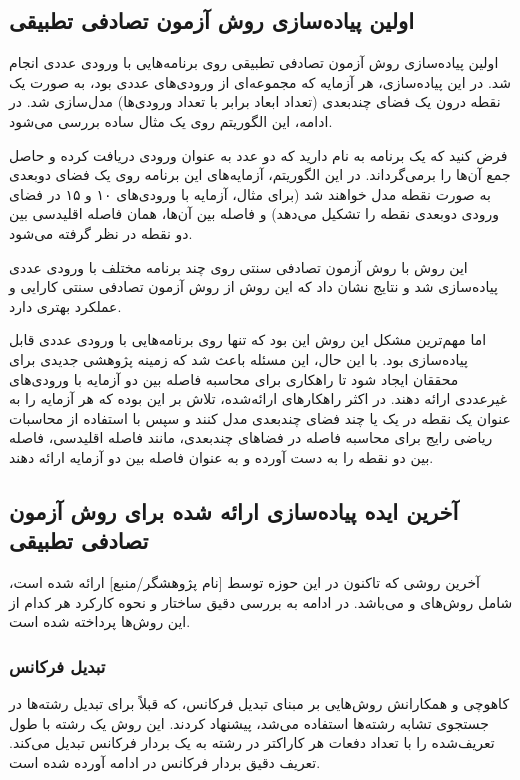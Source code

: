\subsection{اولین پیاده‌سازی روش آزمون تصادفی تطبیقی}
اولین پیاده‌سازی روش آزمون تصادفی تطبیقی روی برنامه‌هایی با ورودی عددی انجام شد. در این پیاده‌سازی، هر آزمایه که مجموعه‌ای از ورودی‌های عددی بود، به صورت یک نقطه درون یک فضای چندبعدی (تعداد ابعاد برابر با تعداد ورودی‌ها) مدل‌سازی شد. در ادامه، این الگوریتم روی یک مثال ساده بررسی می‌شود.

فرض کنید که یک برنامه به نام  دارید که دو عدد به عنوان ورودی دریافت کرده و حاصل جمع آن‌ها را برمی‌گرداند. در این الگوریتم، آزمایه‌های این برنامه روی یک فضای دوبعدی به صورت نقطه مدل خواهند شد (برای مثال، آزمایه با ورودی‌های ۱۰ و ۱۵ در فضای ورودی دوبعدی نقطه  را تشکیل می‌دهد) و فاصله بین آن‌ها، همان فاصله اقلیدسی بین دو نقطه در نظر گرفته می‌شود.

این روش با روش آزمون تصادفی سنتی روی چند برنامه مختلف با ورودی عددی پیاده‌سازی شد و نتایج نشان داد که این روش از روش آزمون تصادفی سنتی کارایی و عملکرد بهتری دارد.

اما مهم‌ترین مشکل این روش این بود که تنها روی برنامه‌هایی با ورودی عددی قابل پیاده‌سازی بود. با این حال، این مسئله باعث شد که زمینه پژوهشی جدیدی برای محققان ایجاد شود تا راهکاری برای محاسبه فاصله بین دو آزمایه با ورودی‌های غیرعددی ارائه دهند. در اکثر راهکارهای ارائه‌شده، تلاش بر این بوده که هر آزمایه را به عنوان یک نقطه در یک یا چند فضای چندبعدی مدل کنند و سپس با استفاده از محاسبات ریاضی رایج برای محاسبه فاصله در فضاهای چندبعدی، مانند فاصله اقلیدسی، فاصله بین دو نقطه را به دست آورده و به عنوان فاصله بین دو آزمایه ارائه دهند.

\subsection{آخرین ایده پیاده‌سازی ارائه شده برای روش آزمون تصادفی تطبیقی}
آخرین روشی که تاکنون در این حوزه توسط [نام پژوهشگر/منبع] ارائه شده است، شامل روش‌های  و  می‌باشد. در ادامه به بررسی دقیق ساختار و نحوه کارکرد هر کدام از این روش‌ها پرداخته شده است.

\subsubsection{تبدیل فرکانس }
کاهوچی و همکارانش روش‌هایی بر مبنای تبدیل فرکانس، که قبلاً برای تبدیل رشته‌ها در جستجوی تشابه رشته‌ها استفاده می‌شد، پیشنهاد کردند. این روش یک رشته با طول تعریف‌شده را با تعداد دفعات هر کاراکتر در رشته به یک بردار فرکانس تبدیل می‌کند. تعریف دقیق بردار فرکانس در ادامه آورده شده است.


